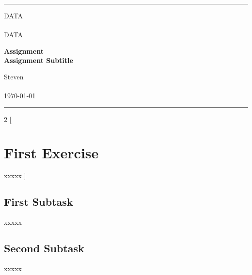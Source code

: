 \documentclass[a4paper, 11pt]{article} %
\begin{document}

\fancyhead[C]{}
\hrule \medskip %
\begin{minipage}{0.295\textwidth} %
    \raggedright
    DATA\\ %
    \footnotesize %
    \hfill\\
    DATA\\ %
\end{minipage}
\begin{minipage}{0.4\textwidth} %
    \centering
    \large %
    \textbf{Assignment}\\ %
    \normalsize %
    \textbf{Assignment Subtitle}\\ %
\end{minipage}
\begin{minipage}{0.295\textwidth} %
    \raggedleft
    Steven\\ %
    \footnotesize %
    \hfill\\
    \today\\ %
\end{minipage}
\medskip\hrule %
\bigskip


\begin{multicols}{2}
    [
        \section{First Exercise}
        xxxxx
    ]

    \subsection{First Subtask}
    xxxxx

    \subsection{Second Subtask}
    xxxxx


\end{multicols}
\end{document}
